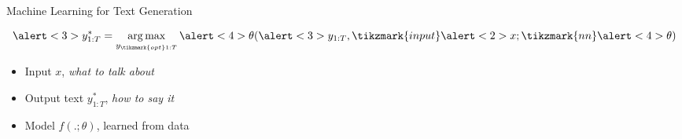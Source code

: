 \begin{frame}{Machine Learning for Text Generation}

  \[ \alert<3>{y^*_{1:T}} = \argmax_{y_{\tikzmark{opt}1:T}} \alert<4>{\theta}(\alert<3>{y_{1:T}}, \tikzmark{input}\alert<2>{x}; \tikzmark{nn}\alert<4>{\theta}) \]



  \begin{itemize}
    \pause
  \item Input \alert<2>{$x$},  \textit{what to talk about}
    \air
    \pause
  \item Output text \alert<3>{$y^*_{1:T}$}, \textit{how to say it}
    \air
    \pause
  \item Model \alert<4>{$f(.; \theta)$}, learned from data
  \end{itemize}
\end{frame}




